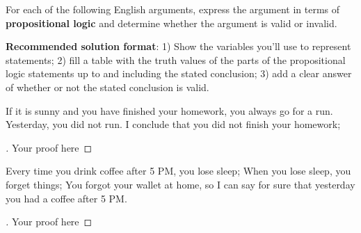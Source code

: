 \documentclass[12pt]{article}
\newenvironment{exercise}[2][Exercise]{\begin{trivlist}
\item[\hskip \labelsep {\bfseries #1}\hskip \labelsep {\bfseries #2.}]}{\end{trivlist}}
\newenvironment{solution}[1][{\color{red} Solution:}]{\begin{trivlist}
\item[\hskip \labelsep {\bfseries #1}\hskip \labelsep {\bfseries}]}{\end{trivlist}}
\begin{document}
 

\newcommand{\mainName}{Your Name Here} %

\newcommand{\collaborators}{
    Team: \textit{(Collaborator names here)}
}


\begin{exercise}{1}
For each of the following English arguments, express the argument in terms of \textbf{propositional logic} and determine whether the argument is valid or invalid.

\textbf{Recommended solution format}: 1) Show the variables you'll use to represent statements; 2) fill a table with the truth values of the parts of the propositional logic statements up to and including the stated conclusion; 3) add a clear answer of whether or not the stated conclusion is valid.

\begin{enumerate}[(a)]


\item If it is sunny and you have finished your homework, you always go for a run. Yesterday, you did not run. I conclude that you did not finish your homework; 
    \begin{solution} 
        \begin{proof}[\unskip\nopunct]
            Your proof here
        \end{proof}

    
    \end{solution}


    \item Every time you drink coffee after 5 PM, you lose sleep; When you lose sleep, you forget things; You forgot your wallet at home, so I can say for sure that yesterday you had a coffee after 5 PM.
    
    \begin{solution} 
        \begin{proof}[\unskip\nopunct]
            Your proof here
        \end{proof}
    \end{solution}
    
\end{enumerate}
\end{exercise}
\end{document}
